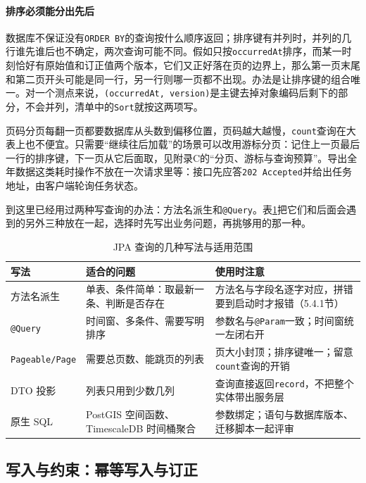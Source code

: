 \paragraph{排序必须能分出先后}数据库不保证没有\texttt{ORDER BY}的查询按什么顺序返回；排序键有并列时，并列的几行谁先谁后也不确定，两次查询可能不同。假如只按\texttt{occurredAt}排序，而某一时刻恰好有原始值和订正值两个版本，它们又正好落在页的边界上，那么第一页末尾和第二页开头可能是同一行，另一行则哪一页都不出现。办法是让排序键的组合唯一。对一个测点来说，\texttt{(occurredAt, version)}是主键去掉对象编码后剩下的部分，不会并列，清单中的\texttt{Sort}就按这两项写。

页码分页每翻一页都要数据库从头数到偏移位置，页码越大越慢，\texttt{count}查询在大表上也不便宜。只需要“继续往后加载”的场景可以改用游标分页：记住上一页最后一行的排序键，下一页从它后面取，见附录C的“分页、游标与查询预算”。导出全年数据这类耗时操作不放在一次请求里等：接口先应答\texttt{202 Accepted}并给出任务地址，由客户端轮询任务状态。

到这里已经用过两种写查询的办法：方法名派生和\texttt{@Query}。表\ref{tab:ch05-jpa-query-strategies}把它们和后面会遇到的另外三种放在一起，选择时先写出业务问题，再挑够用的那一种。

\begin{table}[htbp]
\centering
\small
\caption{JPA 查询的几种写法与适用范围}
\label{tab:ch05-jpa-query-strategies}
\begin{tabular}{p{}p{}p{}}
\toprule
写法 & 适合的问题 & 使用时注意 \\
\midrule
方法名派生 & 单表、条件简单：取最新一条、判断是否存在 & 方法名与字段名逐字对应，拼错要到启动时才报错（5.4.1节） \\
\texttt{@Query} & 时间窗、多条件、需要写明排序 & 参数名与\texttt{@Param}一致；时间窗统一左闭右开 \\
\texttt{Pageable/Page} & 需要总页数、能跳页的列表 & 页大小封顶；排序键唯一；留意\texttt{count}查询的开销 \\
DTO 投影 & 列表只用到少数几列 & 查询直接返回\texttt{record}，不把整个实体带出服务层 \\
原生 SQL & PostGIS 空间函数、TimescaleDB 时间桶聚合 & 参数绑定；语句与数据库版本、迁移脚本一起评审 \\
\bottomrule
\end{tabular}
\end{table}

\subsection{写入与约束：幂等写入与订正}

